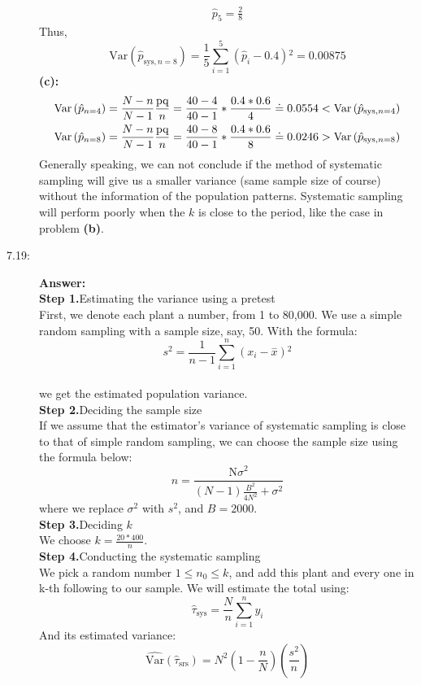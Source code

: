 \documentclass{article}
\begin{document}
\begin{description}
\begin{align}
      \hat{p}_5=\frac{2}{8}
    \end{align}
    Thus,$$\text{Var}\left(\hat{p}_{\text{sys},n=8}\right)=\frac{1}{5}\sum _{i=1}^5 \left(\hat{p}_i-0.4\right){}^2=0.00875$$
    {\bf (c):}
    \begin{align} \notag
      \text{Var}\left(\hat{p}_{n=4}\right)=\frac{N-n}{N-1}\frac{\text{pq}}{n}=\frac{40-4}{40-1}*\frac{0.4*0.6}{4}\doteq 0.0554<\text{Var}\left(\hat{p}_{\text{sys},n=4}\right)\\ \notag
      \text{Var}\left(\hat{p}_{n=8}\right)=\frac{N-n}{N-1}\frac{\text{pq}}{n}=\frac{40-8}{40-1}*\frac{0.4*0.6}{8}\doteq 0.0246>\text{Var}\left(\hat{p}_{\text{sys},n=8}\right)
    \end{align}
    Generally speaking, we can not conclude if the method of systematic sampling will give us a smaller variance (same sample size of course) without the information of the population patterns. Systematic sampling will perform poorly when the $k$ is close to the period, like the case in problem {\bf (b)}.
    \item[7.19:]{\bf Answer:}\\
    {\bf Step 1.}Estimating the variance using a pretest\\
    First, we denote each plant a number, from 1 to 80,000. We use a simple random sampling with a sample size, say, 50. With the formula:
    $$s^2=\frac{1}{n-1}\sum _{i=1}^n \left(x_i-\overset{-}{x}\right){}^2$$\\
    we get the estimated population variance.\\
    {\bf Step 2.}Deciding the sample size\\
    If we assume that the estimator's variance of systematic sampling is close to that of simple random sampling, we can choose the sample size using the formula below:
    $$n=\frac{\text{N$\sigma $}^2}{(N-1)\frac{B^2}{4N^2}+\sigma ^2}$$
    where we replace $\sigma ^2$ with $s^2$, and $B=2000$.\\
    {\bf Step 3.}Deciding $k$\\
    We choose $k=\frac{20*400}{n}$.\\
    {\bf Step 4.}Conducting the systematic sampling\\
    We pick a random number $1\leq n_0\leq k$, and add this plant and every one in k-th following to our sample. We will estimate the total using:$$\hat{\tau }_{\text{sys}}=\frac{N}{n}\sum _{i=1}^n y_i$$
    And its estimated variance:$$\hat{\text{Var}}\left(\hat{\tau }_{\text{srs}}\right)=N^2\left(1-\frac{n}{N}\right)\left(\frac{s^2}{n}\right)$$
    

\end{description}
\end{document}
